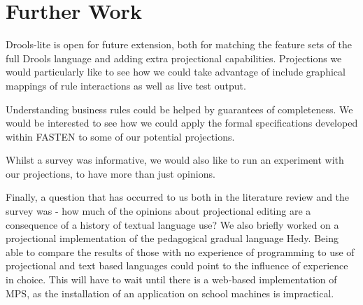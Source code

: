 \section{Further Work}

Drools-lite is open for future extension, both for matching the feature sets of the full Drools language and adding extra projectional capabilities.
Projections we would particularly like to see how we could take advantage of include graphical mappings of rule interactions as well as live test output.

Understanding business rules could be helped by guarantees of completeness.
We would be interested to see how we could apply the formal specifications developed within FASTEN\cite{ratiu2019fasten} to some of our potential projections.

Whilst a survey was informative, we would also like to run an experiment with our projections, to have more than just opinions.

Finally, a question that has occurred to us both in the literature review and the survey was - how much of the opinions about projectional editing are a consequence of a history of textual language use?
We also briefly worked on a projectional implementation of the pedagogical gradual language Hedy\cite{hermans2020hedy}.
Being able to compare the results of those with no experience of programming to use of projectional and text based languages could point to the influence of experience in choice.
This will have to wait until there is a web-based implementation of MPS, as the installation of an application on school machines is impractical.
